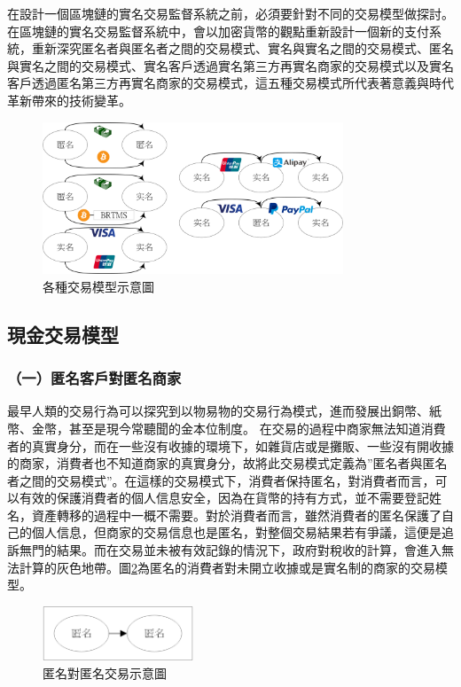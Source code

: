 在設計一個區塊鏈的實名交易監督系統之前，必須要針對不同的交易模型做探討。
在區塊鏈的實名交易監督系統中，會以加密貨幣的觀點重新設計一個新的支付系統，重新深究匿名者與匿名者之間的交易模式、實名與實名之間的交易模式、匿名與實名之間的交易模式、實名客戶透過實名第三方再實名商家的交易模式以及實名客戶透過匿名第三方再實名商家的交易模式，這五種交易模式所代表著意義與時代革新帶來的技術變革。
\begin{figure}[!htbp]
	\centering
	\includegraphics[width = 0.8\textwidth]{modeall.png}
	\caption{各種交易模型示意圖}\label{modeall}
\end{figure}

	\subsection{現金交易模型}
		\subsubsection{（一）匿名客戶對匿名商家}最早人類的交易行為可以探究到以物易物的交易行為模式，進而發展出銅幣、紙幣、金幣，甚至是現今常聽聞的金本位制度。 
		在交易的過程中商家無法知道消費者的真實身分，而在一些沒有收據的環境下，如雜貨店或是攤販、一些沒有開收據的商家，消費者也不知道商家的真實身分，故將此交易模式定義為”匿名者與匿名者之間的交易模式”。在這樣的交易模式下，消費者保持匿名，對消費者而言，可以有效的保護消費者的個人信息安全，因為在貨幣的持有方式，並不需要登記姓名，資產轉移的過程中一概不需要。對於消費者而言，雖然消費者的匿名保護了自己的個人信息，但商家的交易信息也是匿名，對整個交易結果若有爭議，這便是追訴無門的結果。而在交易並未被有效記錄的情況下，政府對稅收的計算，會進入無法計算的灰色地帶。圖\ref{modeaa}為匿名的消費者對未開立收據或是實名制的商家的交易模型。

		\begin{figure}[!htbp]
			\centering
			\includegraphics[width = 0.4\textwidth]{modeaa.png}
			\caption{匿名對匿名交易示意圖}\label{modeaa}
		\end{figure}


